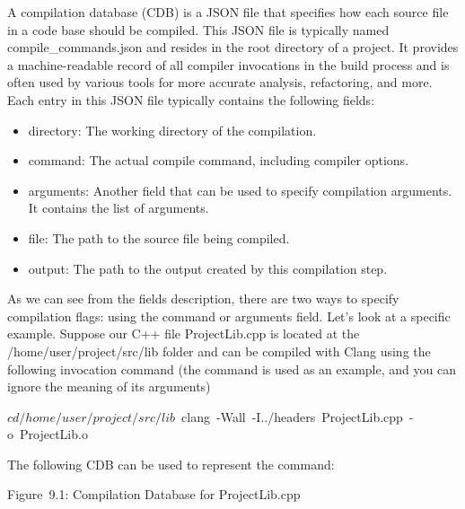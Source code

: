 A compilation database (CDB) is a JSON file that specifies how each source file in a code base should be compiled. This JSON file is typically named compile\_commands.json and resides in the root directory of a project. It provides a machine-readable record of all compiler invocations in the build process and is often used by various tools for more accurate analysis, refactoring, and more. Each entry in this JSON file typically contains the following fields:

\begin{itemize}
\item
directory: The working directory of the compilation.

\item
command: The actual compile command, including compiler options.

\item
arguments: Another field that can be used to specify compilation arguments. It contains the list of arguments.

\item
file: The path to the source file being compiled.

\item
output: The path to the output created by this compilation step.
\end{itemize}

As we can see from the fields description, there are two ways to specify compilation flags: using the command or arguments field. Let's look at a specific example. Suppose our C++ file ProjectLib.cpp is located at the /home/user/project/src/lib folder and can be compiled with Clang using the following invocation command (the command is used as an example, and you can ignore the meaning of its arguments)

\begin{shell}
$ cd /home/user/project/src/lib
$ clang -Wall -I../headers ProjectLib.cpp -o ProjectLib.o
\end{shell}

The following CDB can be used to represent the command:

\begin{shell}
\end{shell}

\begin{center}
Figure 9.1: Compilation Database for ProjectLib.cpp
\end{center}

